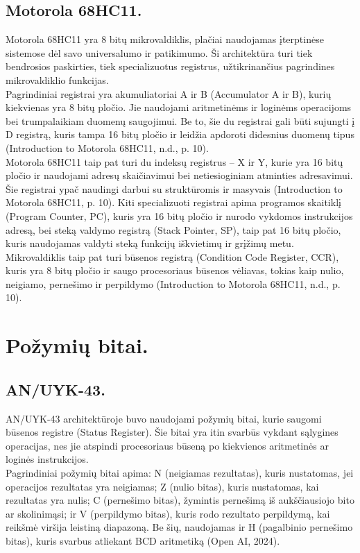\documentclass[a4paper,12pt]{article}
\begin{document}
\subsection{Motorola 68HC11.}
Motorola 68HC11 yra 8 bitų mikrovaldiklis, plačiai naudojamas įterptinėse sistemose dėl savo universalumo ir patikimumo. Ši architektūra turi tiek bendrosios paskirties, tiek specializuotus registrus, užtikrinančius pagrindines mikrovaldiklio funkcijas.\\
Pagrindiniai registrai yra akumuliatoriai A ir B (Accumulator A ir B), kurių kiekvienas yra 8 bitų pločio. Jie naudojami aritmetinėms ir loginėms operacijoms bei trumpalaikiam duomenų saugojimui. Be to, šie du registrai gali būti sujungti į D registrą, kuris tampa 16 bitų pločio ir leidžia apdoroti didesnius duomenų tipus (Introduction to Motorola 68HC11, n.d., p. 10).\\
Motorola 68HC11 taip pat turi du indeksų registrus – X ir Y, kurie yra 16 bitų pločio ir naudojami adresų skaičiavimui bei netiesioginiam atminties adresavimui. Šie registrai ypač naudingi darbui su struktūromis ir masyvais (Introduction to Motorola 68HC11, p. 10).
Kiti specializuoti registrai apima programos skaitiklį (Program Counter, PC), kuris yra 16 bitų pločio ir nurodo vykdomos instrukcijos adresą, bei steką valdymo registrą (Stack Pointer, SP), taip pat 16 bitų pločio, kuris naudojamas valdyti steką funkcijų iškvietimų ir grįžimų metu. Mikrovaldiklis taip pat turi būsenos registrą (Condition Code Register, CCR), kuris yra 8 bitų pločio ir saugo procesoriaus būsenos vėliavas, tokias kaip nulio, neigiamo, pernešimo ir perpildymo (Introduction to Motorola 68HC11, n.d., p. 10).

\section{Požymių bitai.}
\subsection{AN/UYK-43.}
AN/UYK-43 architektūroje buvo naudojami požymių bitai, kurie saugomi būsenos registre (Status Register). Šie bitai yra itin svarbūs vykdant sąlygines operacijas, nes jie atspindi procesoriaus būseną po kiekvienos aritmetinės ar loginės instrukcijos.\\
Pagrindiniai požymių bitai apima: N (neigiamas rezultatas), kuris nustatomas, jei operacijos rezultatas yra neigiamas; Z (nulio bitas), kuris nustatomas, kai rezultatas yra nulis; C (pernešimo bitas), žymintis pernešimą iš aukščiausiojo bito ar skolinimąsi; ir V (perpildymo bitas), kuris rodo rezultato perpildymą, kai reikšmė viršija leistiną diapazoną. Be šių, naudojamas ir H (pagalbinio pernešimo bitas), kuris svarbus atliekant BCD aritmetiką (Open AI, 2024).
\end{document}
